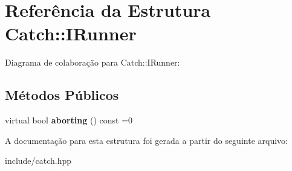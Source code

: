 \hypertarget{structCatch_1_1IRunner}{}\section{Referência da Estrutura Catch\+:\+:I\+Runner}
\label{structCatch_1_1IRunner}


Diagrama de colaboração para Catch\+:\+:I\+Runner\+:
\subsection*{Métodos Públicos}
\begin{DoxyCompactItemize}
\item 
virtual bool {\bfseries aborting} () const =0\hypertarget{structCatch_1_1IRunner_a03713202dd2e041e30b8030088ab0116}{}\label{structCatch_1_1IRunner_a03713202dd2e041e30b8030088ab0116}

\end{DoxyCompactItemize}


A documentação para esta estrutura foi gerada a partir do seguinte arquivo\+:\begin{DoxyCompactItemize}
\item 
include/catch.\+hpp\end{DoxyCompactItemize}
